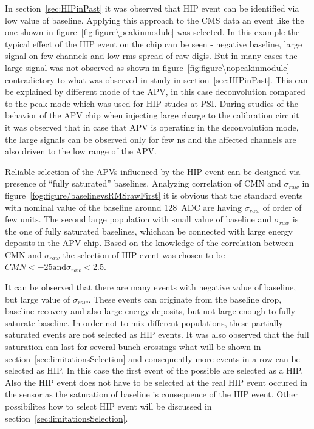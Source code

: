 In section~\ref{sec:HIPinPast} it was observed that HIP event can be identified via low value of baseline. Applying this approach to the CMS data an event like the one shown in figure~\ref{fig:figure\peakinmodule} was selected. In this example the typical effect of the HIP event on the chip can be seen - negative baseline, large signal on few channels and low rms spread of raw digis. But in many cases the large signal was not observed as shown in figure~\ref{fig:figure\nopeakinmodule} contradictory to what was observed in study in section~\ref{sec:HIPinPast}. This can be explained by different mode of the APV, in this case deconvolution compared to the peak mode which was used for HIP studes at PSI. During studies of the behavior of the APV chip when injecting large charge to the calibration circuit~\cite{Bainbridge:2002bda} it was observed that in case that APV is operating in the deconvolution mode, the large signals can be observed only for few ns and the affected channels are also driven to the low range of the APV. 


Reliable selection of the APVs influenced by the HIP event can be designed via presence of ``fully saturated'' baselines. Analyzing correlation of CMN and $\sigma_{raw}$ in figure~\ref{fog:figure/baselinevsRMSrawFirst} it is obvious that the standard events with nominal value of the baseline around 128~ADC are having $\sigma_{raw}$ of order of few units. The second large population with small value of baseline and $\sigma_{raw}$ is the one of fully saturated baselines, whichcan be connected with large energy deposits in the APV chip. Based on the knowledge of the correlation between CMN and $\sigma_{raw}$ the selection of HIP event was chosen to be $CMN<-25 \mathrm{and} \sigma_{raw}<2.5$.


It can be observed that there are many events with negative value of baseline, but large value of $\sigma_{raw}$. These events can originate from the baseline drop, baseline recovery and also large energy deposits, but not large enough to fully saturate baseline. In order not to mix different populations, these partially saturated events are not selected as HIP events. It was also observed that the full saturation can last for several bunch crossings what will be shown in section~\ref{sec:limitationsSelection} and consequently more events in a row can be selected as HIP. In this case the first event of the possible are selected as a HIP. Also the HIP event does not have to be selected at the real HIP event occured in the sensor as the saturation of baseline is consequence of the HIP event. Other possibilites how to select HIP event will be discussed in section~\ref{sec:limitationsSelection}.

